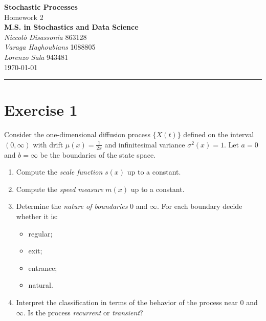 \documentclass[12pt]{article}
\begin{document}
	\textcolor{UM_Brown}{
		\begin{center}
			\textbf{\Large Stochastic Processes}\\
			\vspace{5pt}
			Homework 2 \\
			\vspace{5pt}
			\textbf{M.S. in Stochastics and Data Science}\\
			\vspace{20pt}
			\textit{Niccolò Disassonia} 863128 \\
			\textit{Varaga Haghoubians} 1088805\\
			\textit{Lorenzo Sala} 943481\\
			\vspace{5pt}
			\today
		\end{center}
		\vspace{10pt}
		\hrule
	}
	
	
	
	
	\section*{Exercise 1}
	Consider the one-dimensional diffusion process $\{X(t)\}$ defined on the interval $(0,\infty)$ with drift $\mu(x)=\frac{1}{2x}$ and infinitesimal variance $\sigma^{2}(x)=1$. Let $a=0$ and $b=\infty$ be the boundaries of the state space.
	\begin{enumerate}
		\item Compute the \emph{scale function} $s(x)$ up to a constant.
		\item Compute the \emph{speed measure} $m(x)$ up to a constant.
		\item Determine the \emph{nature of boundaries} $0$ and $\infty$. For each boundary decide whether it is: 
		\begin{itemize}
			\item regular;
			\item exit;
			\item entrance;
			\item natural.
		\end{itemize}
		\item Interpret the classification in terms of the behavior of the process near $0$ and $\infty$. Is the process \emph{recurrent} or \emph{transient}?
	\end{enumerate}
\end{document}
